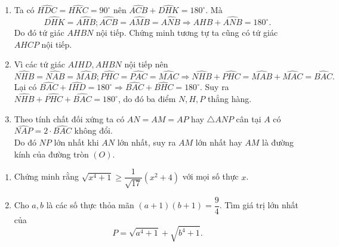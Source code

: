 \begin{ex}
{\begin{enumerate}
\item  Ta có $\widehat{HDC}=\widehat{HKC}=90^{\circ}$ nên $\widehat{ACB}+\widehat{DHK}=180^{\circ}$. Mà $$\widehat{DHK}=\widehat{AHB}; \widehat{ACB}=\widehat{AMB}=\widehat{ANB}\Rightarrow\widehat{AHB}+\widehat{ANB}=180^{\circ}.$$ Do đó tứ giác $AHBN$ nội tiếp. Chứng minh tương tự ta cũng có tứ giác $AHCP$ nội tiếp.
\item  Vì các tứ giác $AIHD, AHBN$ nội tiếp nên $$\widehat{NHB}=\widehat{NAB}=\widehat{MAB}; \widehat{PHC}=\widehat{PAC}=\widehat{MAC}\Rightarrow \widehat{NHB}+\widehat{PHC}=\widehat{MAB}+\widehat{MAC}=\widehat{BAC}.$$ Lại có $\widehat{BAC}+\widehat{IHD}=180^{\circ} \Rightarrow \widehat{BAC}+\widehat{BHC}=180^{\circ}$.
Suy ra $\widehat{NHB}+\widehat{PHC}+\widehat{BAC}=180^{\circ}$, do đó ba điểm $N, H, P$ thẳng hàng.
\item  	Theo tính chất đối xứng ta có $AN=AM=AP$ hay $\triangle ANP$ cân tại $A$ có $\widehat{NAP}=2\cdot \widehat{BAC}$ không đổi. \\Do đó $NP$ lớn nhất khi $AN$ lớn nhất, suy ra $AM$ lớn nhất hay $AM$ là đường kính của đường tròn $(O)$.
\end{enumerate}
}
\end{ex}

\begin{ex}%
\begin{enumerate}
\item  Chứng minh rằng $\sqrt{x^4+1}\geq \dfrac{1}{\sqrt{17}}(x^2+4)$ với mọi số thực $x$.
\item  Cho $a, b$ là các số thực thỏa mãn $(a+1)(b+1)=\dfrac{9}{4}$. Tìm giá trị lớn nhất của $$P=\sqrt{a^4+1}+\sqrt{b^4+1}.$$
\end{enumerate}
\end{ex}

